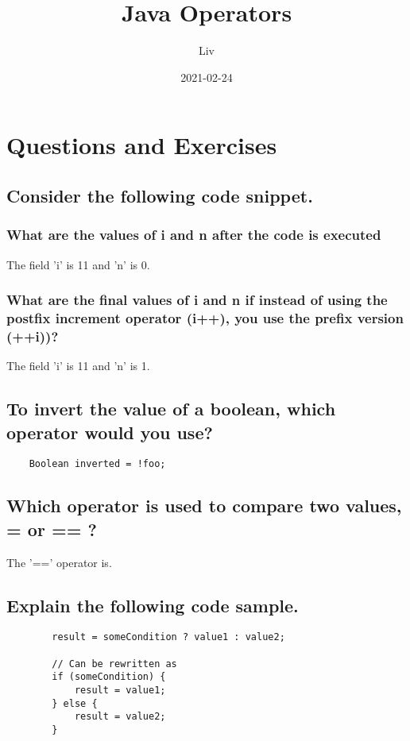 \documentclass{article}
\title{Java Operators}
\date{2021-02-24}
\author{Liv}
\begin{document}
    \maketitle

    \section{Questions and Exercises}

    \subsection{Consider the following code snippet.}
    \subsubsection{What are the values of i and n after the code is executed}
    The field 'i' is 11 and 'n' is 0.

    \subsubsection{What are the final values of i and n if instead of using the postfix increment operator (i++), you use the prefix version (++i))?}
    The field 'i' is 11 and 'n' is 1.

    \subsection{To invert the value of a boolean, which operator would you use?}
    \begin{verbatim}
    Boolean inverted = !foo;
    \end{verbatim}

    \subsection{Which operator is used to compare two values, = or == ?}
    The '==' operator is.

    \subsection{Explain the following code sample.}
    \begin{verbatim}
        result = someCondition ? value1 : value2;

        // Can be rewritten as
        if (someCondition) {
            result = value1;
        } else {
            result = value2;
        }
    \end{verbatim}
\end{document}
